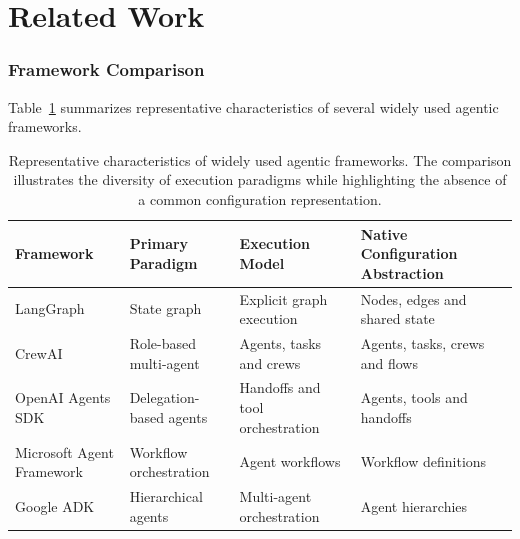 \documentclass[10pt]{article}
\begin{document}
\appendices

\section{Related Work}
\label{appendix:related_work}
\subsubsection{Framework Comparison}
Table~\ref{tab:framework_comparison} summarizes representative characteristics of several widely used agentic frameworks.
\begin{table}[t]
	\centering
	\caption{Representative characteristics of widely used agentic frameworks. The comparison illustrates the diversity of execution paradigms while highlighting the absence of a common configuration representation.}
	\label{tab:framework_comparison}
	
	\renewcommand{\arraystretch}{1.15}
	
	\begin{tabular}{p{3.2cm}p{3.1cm}p{3.4cm}p{3.4cm}c}
		\toprule
		\textbf{Framework}
		&
		\textbf{Primary Paradigm}
		&
		\textbf{Execution Model}
		&
		\textbf{Native Configuration Abstraction}
		\\
		\midrule
		
		LangGraph
		&
		State graph
		&
		Explicit graph execution
		&
		Nodes, edges and shared state
		\\
		
		CrewAI
		&
		Role-based multi-agent
		&
		Agents, tasks and crews
		&
		Agents, tasks, crews and flows
		\\
		
		OpenAI Agents SDK
		&
		Delegation-based agents
		&
		Handoffs and tool orchestration
		&
		Agents, tools and handoffs
		\\
		
		Microsoft Agent Framework
		&
		Workflow orchestration
		&
		Agent workflows
		&
		Workflow definitions
		\\
		
		Google ADK
		&
		Hierarchical agents
		&
		Multi-agent orchestration
		&
		Agent hierarchies
		\\
		
		\bottomrule
	\end{tabular}
	
\end{table}
\end{document}
